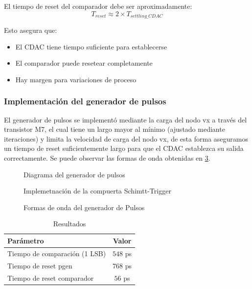 \documentclass[12pt,a4paper]{report}
\begin{document}
El tiempo de reset del comparador debe ser aproximadamente:
\begin{equation}
T_{reset} \approx 2 \times T_{settling\_CDAC}
\end{equation}

Esto asegura que:
\begin{itemize}
    \item El CDAC tiene tiempo suficiente para establecerse
    \item El comparador puede resetear completamente 
    \item Hay margen para variaciones de proceso
\end{itemize}

\subsubsection{Implementación del generador de pulsos}

El generador de pulsos  se implementó mediante la carga del nodo vx a través del transistor M7, el cual tiene un largo mayor al mínimo (ajustado mediante iteraciones) y limita la velocidad de carga del nodo vx, de esta forma aseguramos un tiempo de reset suficientemente largo para que el CDAC establezca su salida correctamente. Se puede observar las formas de onda obtenidas en \cref{pgensen}.

\begin{figure}[H]
    \centering
    
    \caption{Diagrama del generador de pulsos}
        \label{pgendiag}
\end{figure}

\begin{figure}[H]
    \centering
    
    \caption{Implemetnación de la compuerta Schimtt-Trigger}
        \label{pgenst}
\end{figure}

\begin{figure}[H]
    \centering
    
    \caption{Formas de onda del generador de Pulsos}
        \label{pgensen}
\end{figure}



\begin{table}[H]
\centering
\caption{Resultados}
    \label{compres}
\begin{tabular}{|l|c|}
\hline
\textbf{Parámetro} & \textbf{Valor} \\
\hline
Tiempo de comparación (1 LSB) & $548$ ps \\
Tiempo de reset pgen & $768$ ps \\
Tiempo de reset comparador & $56$ ps \\
\hline
\end{tabular}
\end{table}
\end{document}
